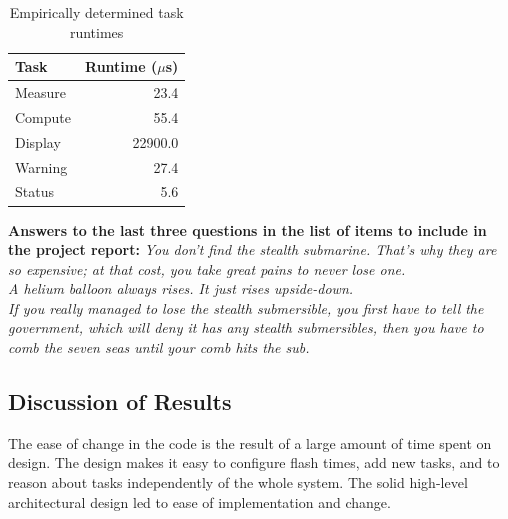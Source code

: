 \documentclass[12pt]{article} %
\begin{document}
\begin{table}[h]
	\centering
	\begin{tabular}{|l|r|} 
		\hline
		Task & Runtime ($\mu$s) \\ \hline
		Measure & 23.4 \\ \hline
		Compute & 55.4 \\ \hline
		Display & 22900.0 \\ \hline
		Warning & 27.4	\\ \hline
		Status & 5.6	\\ \hline
	\end{tabular}
	\caption{Empirically determined task runtimes}
  \label{tab:taskRuntimes}
\end{table}

\textbf{Answers to the last three questions in the list of items to include in the project report:}
\emph{You don't find the stealth submarine. That's why they are so expensive; at that cost, you take great pains to never lose one.\\
A helium balloon always rises. It just rises upside-down. \\
If you really managed to lose the stealth submersible, you first have to tell the government, which will deny it has any stealth submersibles, then you have to comb the seven seas until your comb hits the sub.}
 
\subsection{Discussion of Results}
The ease of change in the code is the result of a large amount of time spent on
design.  The design makes it easy to configure flash times, add new tasks, and
to reason about tasks independently of the whole system.  The solid high-level
architectural design led to ease of implementation and change.
\end{document}
